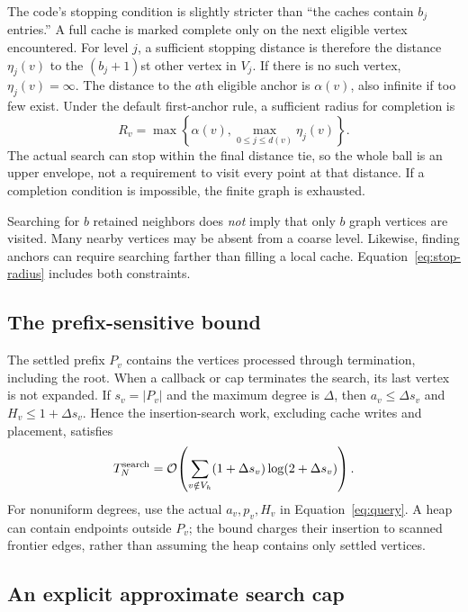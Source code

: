 \documentclass[11pt,a4paper]{article}
\newcommand{\bigO}{\mathcal O}
\begin{document}
The code's stopping condition is slightly stricter than ``the caches contain
$b_j$ entries.'' A full cache is marked complete only on the next eligible
vertex encountered. For level $j$, a sufficient stopping distance is therefore
the distance $\eta_j(v)$ to the $(b_j+1)$st other vertex in $V_j$. If there is no
such vertex, $\eta_j(v)=\infty$. The distance to the $a$th eligible anchor is
$\alpha(v)$, also infinite if too few exist. Under the default first-anchor
rule, a sufficient radius for completion is
\begin{equation}
 R_v=\max\!\left\{\alpha(v),\max_{0\leq j\leq d(v)}\eta_j(v)\right\}.
 \label{eq:stop-radius}
\end{equation}
The actual search can stop within the final distance tie, so the whole ball is
an upper envelope, not a requirement to visit every point at that distance.
If a completion condition is impossible, the finite graph is exhausted.

Searching for $b$ retained neighbors does \emph{not} imply that only $b$ graph
vertices are visited. Many nearby vertices may be absent from a coarse level.
Likewise, finding anchors can require searching farther than filling a local
cache. Equation~\eqref{eq:stop-radius} includes both constraints.

\subsection{The prefix-sensitive bound}

The settled prefix $P_v$ contains the vertices processed through termination,
including the root. When a callback or cap terminates the search, its last
vertex is not expanded. If $s_v=|P_v|$ and the maximum degree is $\Delta$,
then $a_v\leq\Delta s_v$ and $H_v\leq 1+\Delta s_v$. Hence the insertion-search
work, excluding cache writes and placement, satisfies
\begin{equation}
 T_N^{\rm search}=\bigO\!\left(
   \sum_{v\notin V_h}(1+\Delta s_v)
        \log(2+\Delta s_v)\right).
 \label{eq:prefix}
\end{equation}
For nonuniform degrees, use the actual $a_v,p_v,H_v$ in
Equation~\eqref{eq:query}. A heap can contain endpoints outside $P_v$; the bound
charges their insertion to scanned frontier edges, rather than assuming the
heap contains only settled vertices.

\subsection{An explicit approximate search cap}
\end{document}
